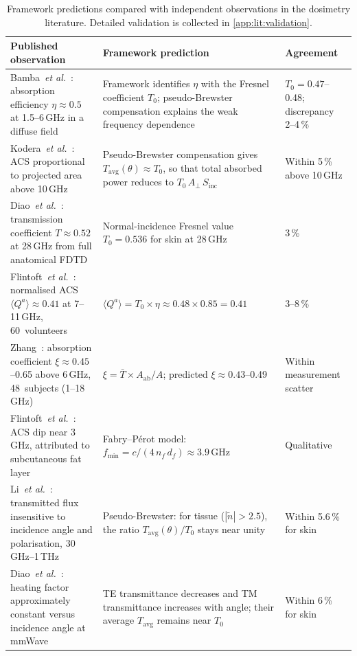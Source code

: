 \documentclass[11pt,a4paper]{article}
\theoremstyle{definition}      %
\newcommand{\Sinc}{S_{\mathrm{inc}}}
\newcommand{\Tavg}{T_{\mathrm{avg}}}
\newcommand{\Aab}{A_{\mathrm{ab}}}
\newcommand{\Aperp}{A_{\perp}}
\newcommand{\ntilde}{\tilde{n}}
\newcommand{\Tbar}{\bar{T}}
\begin{document}
\begin{table}[!htbp]
\centering
\caption{Framework predictions compared with independent observations
  in the dosimetry literature.  Detailed validation is collected in
  \cref{app:lit:validation}.}\label{tab:lit:predictions}
\small
\begin{tabularx}{\textwidth}{XXl}
\toprule
Published observation & Framework prediction & Agreement \\
\midrule
Bamba~\textit{et al.}~\cite{Bamba2012,Bamba2014}:
  absorption efficiency $\eta \approx 0.5$ at 1.5--6\,GHz
  in a diffuse field
& Framework identifies $\eta$ with the Fresnel
  coefficient $T_0$; pseudo-Brewster compensation
  explains the weak frequency dependence
& $T_0 = 0.47$--0.48; discrepancy 2--4\,\% \\[4pt]
%
Kodera~\textit{et al.}~\cite{Kodera2024}:
  ACS proportional to projected area above 10\,GHz
& Pseudo-Brewster compensation gives
  $\Tavg(\theta) \approx T_0$, so that
  total absorbed power reduces to $T_0\,\Aperp\,\Sinc$
& Within 5\,\% above 10\,GHz \\[4pt]
%
Diao~\textit{et al.}~\cite{Diao2024}:
  transmission coefficient $T \approx 0.52$ at 28\,GHz
  from full anatomical FDTD
& Normal-incidence Fresnel value
  $T_0 = 0.536$ for skin at 28\,GHz
& 3\,\% \\[4pt]
%
Flintoft~\textit{et al.}~\cite{Flintoft2014}:
  normalised ACS $\langle Q^a\rangle \approx 0.41$ at
  7--11\,GHz, 60~volunteers
& $\langle Q^a\rangle = T_0 \times \eta \approx
  0.48 \times 0.85 = 0.41$
& 3--8\,\% \\[4pt]
%
Zhang~\cite{Zhang2017thesis,ZhangRobinson2020}:
  absorption coefficient $\xi \approx 0.45$--0.65 above
  6\,GHz, 48~subjects (1--18\,GHz)
& $\xi = \Tbar \times \Aab/A$;
  predicted $\xi \approx 0.43$--0.49
& Within measurement scatter \\[4pt]
%
Flintoft~\textit{et al.}~\cite{Flintoft2014}:
  ACS dip near 3\,GHz, attributed to subcutaneous
  fat layer
& Fabry--P\'{e}rot model:
  $f_{\min} = c/(4\,n_f\,d_f) \approx 3.9$\,GHz
& Qualitative \\[4pt]
%
Li~\textit{et al.}~\cite{Li2019}:
  transmitted flux insensitive to incidence angle
  and polarisation, 30\,GHz--1\,THz
& Pseudo-Brewster: for tissue ($|\ntilde| > 2.5$),
  the ratio $\Tavg(\theta)/T_0$ stays near unity
& Within 5.6\,\% for skin \\[4pt]
%
Diao~\textit{et al.}~\cite{Diao2021}:
  heating factor approximately constant versus
  incidence angle at mmWave
& TE transmittance decreases and TM transmittance
  increases with angle; their average $\Tavg$
  remains near $T_0$
& Within 6\,\% for skin \\
\bottomrule
\end{tabularx}
\end{table}
\end{document}

